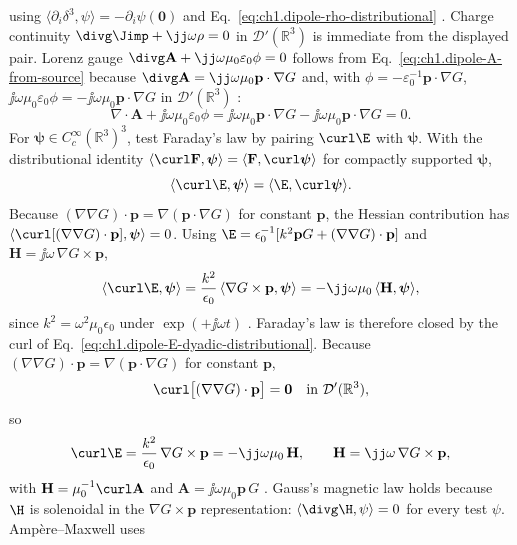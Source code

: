 using $\langle\partial_i\delta^{3},\psi\rangle=-\partial_i\psi(\mathbf{0})$ and Eq.~\eqref{eq:ch1.dipole-rho-distributional} \cite{jackson1999,stratton1941}. Charge continuity $\divg\Jimp+\jj\omega\rho=0$ in $\mathcal{D}'(\mathbb{R}^{3})$ is immediate from the displayed pair. Lorenz gauge $\divg\mathbf{A}+\jj\omega\mu_0\varepsilon_0\phi=0$ follows from Eq.~\eqref{eq:ch1.dipole-A-from-source} because $\divg\mathbf{A}=\jj\omega\mu_0\mathbf{p}\cdot\nabla G$ and, with $\phi=-\varepsilon_0^{-1}\mathbf{p}\cdot\nabla G$, $\jj\omega\mu_0\varepsilon_0\phi=-\jj\omega\mu_0\mathbf{p}\cdot\nabla G$ in $\mathcal{D}'(\mathbb{R}^{3})$ \cite{jackson1999,stratton1941}:
\begin{equation}
\label{eq:ch1.dipole-lorenz-gauge}
\nabla\cdot\mathbf{A}+\jj\omega\mu_0\varepsilon_0\phi
=\jj\omega\mu_0\mathbf{p}\cdot\nabla G
-\jj\omega\mu_0\mathbf{p}\cdot\nabla G=0.
\end{equation}
For $\boldsymbol\psi\in C_c^\infty(\mathbb{R}^{3})^{3}$, test Faraday's law by pairing $\curl\E$ with $\boldsymbol\psi$. With the distributional identity $\langle\curl\mathbf F,\boldsymbol\psi\rangle=\langle\mathbf F,\curl\boldsymbol\psi\rangle$ for compactly supported $\boldsymbol\psi$,
\[
\langle\curl\E,\boldsymbol\psi\rangle
=\langle\E,\curl\boldsymbol\psi\rangle.
\]
Because $(\nabla\nabla G)\cdot\mathbf{p}=\nabla(\mathbf{p}\cdot\nabla G)$ for constant $\mathbf{p}$, the Hessian contribution has $\langle\curl[(\nabla\nabla G)\cdot\mathbf{p}],\boldsymbol\psi\rangle=0$. Using $\E=\epsilon_0^{-1}[k^{2}\mathbf{p}G+(\nabla\nabla G)\cdot\mathbf{p}]$ and $\mathbf{H}=\jj\omega\,\nabla G\times\mathbf{p}$,
\[
\langle\curl\E,\boldsymbol\psi\rangle
=\frac{k^{2}}{\epsilon_0}\,\langle\nabla G\times\mathbf{p},\boldsymbol\psi\rangle
=-\jj\omega\mu_0\,\langle\mathbf{H},\boldsymbol\psi\rangle,
\]
since $k^{2}=\omega^{2}\mu_0\epsilon_0$ under $\exp(+\jj\omega t)$ \cite{jackson1999,stratton1941}. Faraday's law is therefore closed by the curl of Eq.~\eqref{eq:ch1.dipole-E-dyadic-distributional}. Because $(\nabla\nabla G)\cdot\mathbf{p}=\nabla(\mathbf{p}\cdot\nabla G)$ for constant $\mathbf{p}$,
\[
\curl\bigl[(\nabla\nabla G)\cdot\mathbf{p}\bigr]=\mathbf{0}
\quad\text{in }\mathcal{D}'(\mathbb{R}^{3}),
\]
so
\begin{equation}
\label{eq:ch1.dipole-faraday-distributional}
\curl\E
=\frac{k^{2}}{\epsilon_0}\,\nabla G\times\mathbf{p}
=-\jj\omega\mu_0\,\mathbf{H},
\qquad
\mathbf{H}=\jj\omega\,\nabla G\times\mathbf{p},
\end{equation}
with $\mathbf{H}=\mu_0^{-1}\curl\mathbf{A}$ and $\mathbf{A}=\jj\omega\mu_0\mathbf{p}\,G$ \cite{jackson1999,stratton1941}. Gauss's magnetic law holds because $\H$ is solenoidal in the $\nabla G\times\mathbf{p}$ representation: $\langle\divg\H,\psi\rangle=0$ for every test $\psi$. Amp\`ere--Maxwell uses
